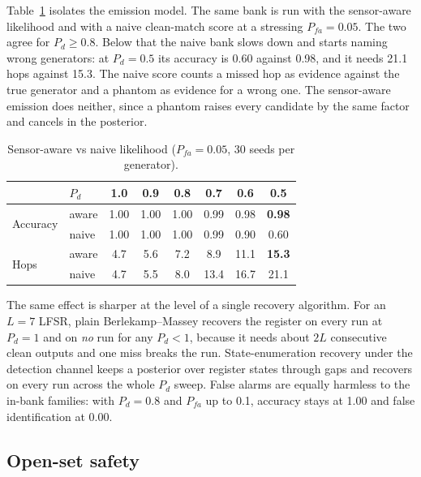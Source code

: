 Table~\ref{tab:ablation} isolates the emission model. The same bank is run with
the sensor-aware likelihood and with a naive clean-match score at a stressing
$P_{fa}=0.05$. The two agree for $P_d\ge0.8$. Below that the naive bank slows
down and starts naming wrong generators: at $P_d=0.5$ its accuracy is 0.60
against 0.98, and it needs 21.1 hops against 15.3. The naive score counts a
missed hop as evidence against the true generator and a phantom as evidence for
a wrong one. The sensor-aware emission does neither, since a phantom raises
every candidate by the same factor and cancels in the posterior.

\begin{table}[t]
\centering
\caption{Sensor-aware vs naive likelihood ($P_{fa}=0.05$, 30 seeds per generator).}
\label{tab:ablation}
\begin{tabular}{llcccccc}
\toprule
& $P_d$ & 1.0 & 0.9 & 0.8 & 0.7 & 0.6 & 0.5 \\
\midrule
\multirow{2}{*}{Accuracy} & aware & 1.00 & 1.00 & 1.00 & 0.99 & 0.98 & \textbf{0.98} \\
                          & naive & 1.00 & 1.00 & 1.00 & 0.99 & 0.90 & 0.60 \\
\midrule
\multirow{2}{*}{Hops}     & aware & 4.7 & 5.6 & 7.2 & 8.9  & 11.1 & \textbf{15.3} \\
                          & naive & 4.7 & 5.5 & 8.0 & 13.4 & 16.7 & 21.1 \\
\bottomrule
\end{tabular}
\end{table}

The same effect is sharper at the level of a single recovery algorithm. For an
$L=7$ LFSR, plain Berlekamp--Massey recovers the register on every run at
$P_d=1$ and on \emph{no} run for any $P_d<1$, because it needs about $2L$
consecutive clean outputs and one miss breaks the run. State-enumeration
recovery under the detection channel keeps a posterior over register states
through gaps and recovers on every run across the whole $P_d$ sweep. False
alarms are equally harmless to the in-bank families: with $P_d=0.8$ and
$P_{fa}$ up to 0.1, accuracy stays at 1.00 and false identification at 0.00.

\subsection{Open-set safety}
\label{sec:res-safety}

